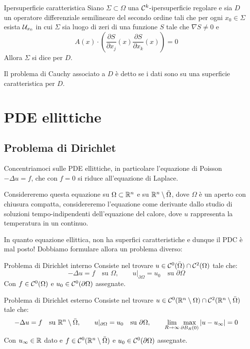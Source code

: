 \documentclass{book}
\begin{document}
\begin{definition}{Ipersuperficie caratteristica}{}
    Siano $\Sigma \subset \Omega$ una $\mathcal{C}^k$-ipersuperficie regolare e sia $D$ un operatore differenziale semilineare del secondo ordine tali che per ogni $x_0 \in \Sigma$ esista $\mathcal{U}_{x_0}$ in cui $\Sigma$ sia luogo di zeri di una funzione $S$ tale che $\nabla S\neq 0$ e 
    \[A(x) \cdot \left(\frac{\partial S}{\partial x_j}(x) \frac{\partial S}{\partial x_k}(x)\right) = 0\]
    Allora $\Sigma$ si dice  per $D$.
\end{definition}

Il problema di Cauchy associato a $D$ è detto  se i dati sono su una superficie caratteristica per $D$.

\chapter{PDE ellittiche}

\section{Problema di Dirichlet}

Concentriamoci sulle PDE ellittiche, in particolare l'equazione di Poisson $-\Delta u = f$, che con $f=0$ si riduce all'equazione di Laplace.

Considereremo questa equazione su $\Omega \subset \mathbb{R}^n$ e su $\mathbb{R}^n \setminus \bar{\Omega}$, dove $\Omega$ è un aperto con chiusura compatta, considereremo l'equazione come derivante dallo studio di soluzioni tempo-indipendenti dell'equazione del calore, dove $u$ rappresenta la temperatura in un continuo.

In quanto equazione ellittica, non ha superfici caratteristiche \Nick e dunque il PDC è mal posto! Dobbiamo formulare allora un problema diverso:

\begin{definition}{Problema di Dirichlet interno}{}
    Consiste nel trovare $u\in\mathcal{C}^0(\bar{\Omega})\cap\mathcal{C}^2(\Omega)$ tale che:
    \[-\Delta u = f \quad\text{su } \Omega, \qquad u|_{\partial\Omega} = u_0 \quad \text{su }\partial\Omega\] 
    Con $f \in \mathcal{C}^0(\Omega)$ e $u_0 \in \mathcal{C}^0(\partial\Omega)$ assegnate.
\end{definition}

\begin{definition}{Problema di Dirichlet esterno}{}
    Consiste nel trovare $u \in \mathcal{C}^0(\mathbb{R}^n \setminus \Omega)\cap\mathcal{C}^2(\mathbb{R}^n \setminus \bar{\Omega})$ tale che:
    \[-\Delta u = f \quad\text{su } \mathbb{R}^n \setminus \bar{\Omega}, \qquad u|_{\partial\Omega} = u_0 \quad \text{su }\partial\Omega, \qquad \lim_{R\to\infty} \max_{\partial B_R(0)} |u-u_\infty| = 0\]
    Con $u_\infty \in \mathbb{R}$ dato e $f \in \mathcal{C}^0(\mathbb{R}^n \setminus \bar{\Omega})$ e $u_0 \in \mathcal{C}^0(\partial\Omega)$ assegnate.
\end{definition}
\end{document}

